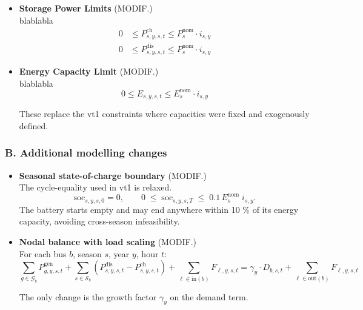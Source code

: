 \begin{itemize}
    \item \textbf{Storage Power Limits} (MODIF.)\\
    blablabla
    \begin{equation}
    \begin{aligned}
    0 &\leq P^{\text{ch}}_{s,y,s,t} \leq P^{\text{nom}}_{s} \cdot i_{s,y} \\
    0 &\leq P^{\text{dis}}_{s,y,s,t} \leq P^{\text{nom}}_{s} \cdot i_{s,y}
    \end{aligned}
    \end{equation}

    \item \textbf{Energy Capacity Limit} (MODIF.)\\
    blablabla
    \begin{equation}
    0 \leq E_{s,y,s,t} \leq E^{\text{nom}}_{s} \cdot i_{s,y}
    \end{equation}
    
    These replace the vt1 constraints where capacities were fixed and exogenously defined.
    
\end{itemize}

\subsubsection*{B.  Additional modelling changes}

\begin{itemize}
    \item \textbf{Seasonal state-of-charge boundary} (MODIF.)\\
    The cycle-equality used in vt1 is relaxed.
    \begin{equation}
        \mathrm{soc}_{s,y,s,0}=0,\qquad
        0\;\le\;\mathrm{soc}_{s,y,s,T}\;\le\;0.1\,E^{\mathrm{nom}}_{s}\; i_{s,y}.
    \end{equation}
    The battery starts empty and may end anywhere within 10 \% of its energy capacity, avoiding cross-season infeasibility.

    \item \textbf{Nodal balance with load scaling} (MODIF.)\\
    For each bus $b$, season $s$, year $y$, hour $t$:
    \begin{equation}
        \sum_{g \in \mathcal{G}_b} P^{\text{gen}}_{g,y,s,t} +
        \sum_{s \in \mathcal{S}_b} (P^{\text{dis}}_{s,y,s,t} - P^{\text{ch}}_{s,y,s,t}) +
        \sum_{\ell \in \text{in}(b)} F_{\ell,y,s,t}
        = 
        \gamma_y \cdot D_{b,s,t} +
        \sum_{\ell \in \text{out}(b)} F_{\ell,y,s,t}
        \label{eq:nodal_new}
        \end{equation}

    The only change is the growth factor $\gamma_y$ on the demand term.
\end{itemize}


